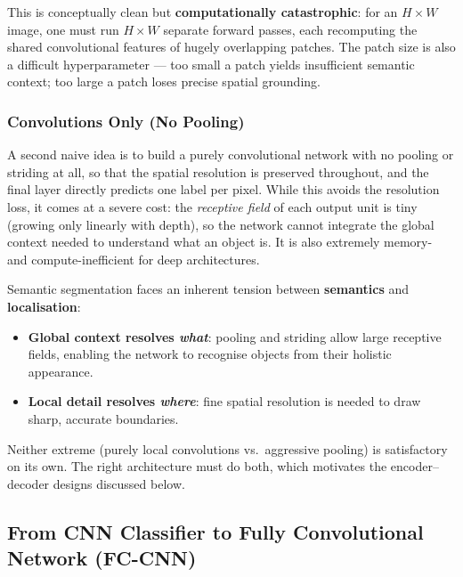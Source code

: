 \documentclass[11pt,a4paper]{article}
\begin{document}
This is conceptually clean but \textbf{computationally catastrophic}: for an $H\times W$ image, one must run $H\times W$ separate forward passes, each recomputing the shared convolutional features of hugely overlapping patches. The patch size is also a difficult hyperparameter — too small a patch yields insufficient semantic context; too large a patch loses precise spatial grounding.

\subsubsection{Convolutions Only (No Pooling)}

A second naive idea is to build a purely convolutional network with no pooling or striding at all, so that the spatial resolution is preserved throughout, and the final layer directly predicts one label per pixel. While this avoids the resolution loss, it comes at a severe cost: the \emph{receptive field} of each output unit is tiny (growing only linearly with depth), so the network cannot integrate the global context needed to understand what an object is. It is also extremely memory- and compute-inefficient for deep architectures.

\begin{insightbox}
Semantic segmentation faces an inherent tension between \textbf{semantics} and \textbf{localisation}:
\begin{itemize}
  \item \textbf{Global context resolves \emph{what}}: pooling and striding allow large receptive fields, enabling the network to recognise objects from their holistic appearance.
  \item \textbf{Local detail resolves \emph{where}}: fine spatial resolution is needed to draw sharp, accurate boundaries.
\end{itemize}
Neither extreme (purely local convolutions vs.\ aggressive pooling) is satisfactory on its own. The right architecture must do both, which motivates the encoder--decoder designs discussed below.
\end{insightbox}

\subsection{From CNN Classifier to Fully Convolutional Network (FC-CNN)}
\label{sec:fccnn}
\end{document}
